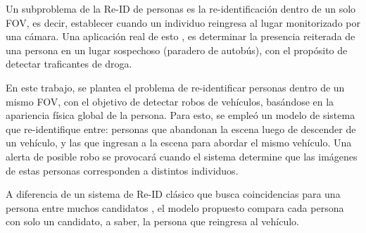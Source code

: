 \documentclass[../memoria.tex]{subfiles}
\begin{document}
\indent Un subproblema de la Re-ID de personas es la re-identificación dentro de un solo FOV, es decir, establecer cuando un individuo reingresa al lugar monitorizado por una cámara. Una aplicación real de esto \cite{bird2005detection}, es determinar la presencia reiterada de una persona en un lugar sospechoso (paradero de autobús), con el propósito de detectar traficantes de droga.

\indent En este trabajo, se plantea el problema de re-identificar personas dentro de un mismo FOV, con el objetivo de detectar robos de vehículos, basándose en la apariencia física global de la persona. Para esto, se empleó un modelo de sistema que re-identifique entre: personas que abandonan la escena luego de descender de un vehículo, y las que ingresan a la escena para abordar el mismo vehículo. Una alerta de posible robo se provocará cuando el sistema determine que las imágenes de estas personas corresponden a distintos individuos.


\indent A diferencia de un sistema de Re-ID clásico que busca coincidencias para una persona entre muchos candidatos \cite{hirzer2012person, prosser2010person, gray2008viewpoint, farenzena2010person, gheissari2006person}, el modelo propuesto compara cada persona con solo un candidato, a saber, la persona que reingresa al vehículo.




\end{document}
